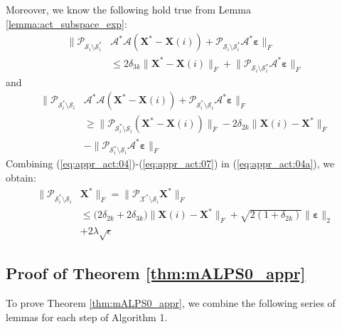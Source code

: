 \documentclass[twocolumn]{svjour3}
\newcommand{\vectornormbig}[1]{\big\|#1\big\|}
\newcommand{\sensing}{\boldsymbol{\mathcal{A}}}
\newcommand{\signal}{\boldsymbol{X}}
\newcommand{\bestsignal}{\boldsymbol{X}^\ast}
\newcommand{\noise}{\boldsymbol{\varepsilon}}
\newcommand{\rank}{k}
\begin{document}
Moreover, we know the following hold true from Lemma \ref{lemma:act_subspace_exp}:
\begin{align}
\vectornormbig{\mathcal{P}_{\mathcal{S}_i \setminus \mathcal{S}_i^\ast} &\sensing^\ast \sensing (\bestsignal - \signal(i)) + \mathcal{P}_{\mathcal{S}_i \setminus \mathcal{S}_i^\ast} \sensing^\ast \noise}_F \nonumber \\ &\leq 2\delta_{3\rank}\vectornormbig{\bestsignal - \signal(i)}_F + \vectornormbig{\mathcal{P}_{\mathcal{S}_i \setminus \mathcal{S}_i^\ast} \sensing^\ast \noise}_F \label{eq:appr_act:06}
\end{align} and
\begin{align}
\vectornormbig{\mathcal{P}_{\mathcal{S}_i^\ast \setminus \mathcal{S}_i} &\sensing^\ast \sensing (\bestsignal - \signal(i)) + \mathcal{P}_{\mathcal{S}_i^\ast \setminus \mathcal{S}_i} \sensing^\ast \noise}_F \nonumber \\ &\geq \vectornormbig{\mathcal{P}_{\mathcal{S}_i^\ast \setminus \mathcal{S}_i} (\bestsignal - \signal(i))}_F - 2\delta_{2\rank}\vectornormbig{\signal(i) - \bestsignal}_F \nonumber \\ &- \vectornormbig{ \mathcal{P}_{\mathcal{S}_i^\ast \setminus \mathcal{S}_i}\sensing^\ast \noise}_F \label{eq:appr_act:07}
\end{align} Combining (\ref{eq:appr_act:04})-(\ref{eq:appr_act:07}) in (\ref{eq:appr_act:04a}), we obtain:
\begin{align}
\vectornormbig{\mathcal{P}_{\mathcal{S}_i^\ast \setminus \mathcal{S}_i}&\bestsignal}_F = \vectornormbig{\mathcal{P}_{\mathcal{X}^\ast \setminus \mathcal{S}_i}\bestsignal}_F \nonumber \\ 
&\leq \big(2\delta_{2\rank} + 2\delta_{3\rank}\big)\vectornormbig{\signal(i) - \bestsignal}_F + \sqrt{2(1+\delta_{2\rank})}\vectornormbig{\noise}_2 \nonumber \\ &+ 2\lambda \sqrt{\epsilon} \nonumber \end{align}

\subsection{Proof of Theorem \ref{thm:mALPS0_appr}}

To prove Theorem \ref{thm:mALPS0_appr}, we combine the following series of lemmas for each step of Algorithm 1.
\end{document}
